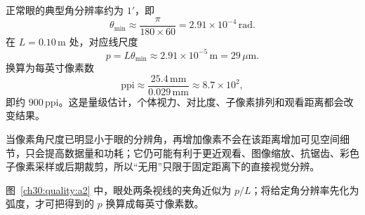 \begin{xesolution}
\begin{center}\begin{minipage}{.96\linewidth}\centering
{}
\end{minipage}\end{center}

正常眼的典型角分辨率约为 $1'$，即
\[
 \theta_{\min}\approx\frac{\pi}{180\times60}=2.91\times10^{-4}\,\mathrm{rad}.
\]
在 $L=0.10\,\mathrm m$ 处，对应线尺度
\[
 p=L\theta_{\min}\approx2.91\times10^{-5}\,\mathrm m=29\,\mu\mathrm m.
\]
换算为每英寸像素数
\[
 \boxed{\mathrm{ppi}\approx\frac{25.4\,\mathrm{mm}}{0.029\,\mathrm{mm}}\approx8.7\times10^2},
\]
即约 $900\,\mathrm{ppi}$。这是量级估计，个体视力、对比度、子像素排列和观看距离都会改变结果。

当像素角尺度已明显小于眼的分辨角，再增加像素不会在该距离增加可见空间细节，只会提高数据量和功耗；它仍可能有利于更近观看、图像缩放、抗锯齿、彩色子像素采样或后期裁剪，所以“无用”只限于固定距离下的直接视觉分辨。

图~\ref{ch30:quality:a2} 中，眼处两条视线的夹角近似为 $p/L$；将给定角分辨率先化为弧度，才可把得到的 $p$ 换算成每英寸像素数。
\end{xesolution}

